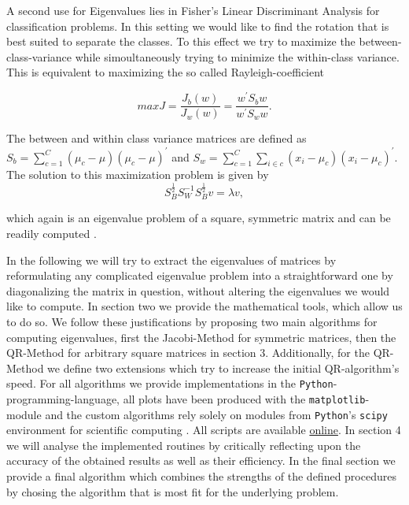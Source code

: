\documentclass[12pt]{article}
\begin{document}
A second use for Eigenvalues lies in Fisher's Linear Discriminant Analysis for classification problems. In this setting we would like to find the rotation that is best suited to separate the classes. To this effect we try to maximize the between-class-variance while simoultaneously trying to minimize the within-class variance. This is equivalent to maximizing the so called Rayleigh-coefficient

\begin{equation}
\label{LDA}
max J = \frac{J_b(w)}{J_w(w)} = \frac{w^{\prime} S_{b} w}{w^{\prime} S_{w} w}.
\end{equation}

The between and within class variance matrices are defined as $S_b = \sum\limits_{c=1}^{C}(\mu_c - \mu)(\mu_c - \mu)^{\prime}$ and $S_w = \sum\limits_{c=1}^{C}\sum\limits_{i \in c}(x_i - \mu_c)(x_i - \mu_c)^{\prime}$. The solution to this maximization problem is given by
\begin{equation}
S_B^{\frac{1}{2}} S_W^{-1} S_B^{\frac{1}{2}} v = \lambda v,
\end{equation}

which again is an eigenvalue problem of a square, symmetric matrix and can be readily computed \citep[p. 219]{duda}.

In the following we will try to extract the eigenvalues of matrices by reformulating any complicated eigenvalue problem into a straightforward one by diagonalizing the matrix in question, without altering the eigenvalues we would like to compute. In section two we provide the mathematical tools, which allow us to do so. We follow these justifications by proposing two main algorithms for computing eigenvalues, first the Jacobi-Method for symmetric matrices, then the QR-Method for arbitrary square matrices in section 3. Additionally, for the QR-Method we define two extensions which try to increase the initial QR-algorithm's speed.
For all algorithms we provide implementations in the \texttt{Python}-programming-language, all plots have been produced with the \texttt{matplotlib}-module and the custom algorithms rely solely on modules from \texttt{Python}'s \texttt{scipy} environment for scientific computing \citep{python, matplotlib, scipy}. All scripts are available \href{https://github.com/thsis/NIS18}{online}. In section 4 we will analyse the implemented routines by critically reflecting upon the accuracy of the obtained results as well as their efficiency. In the final section we provide a final algorithm which combines the strengths of the defined procedures by chosing the algorithm that is most fit for the underlying problem.
\end{document}
